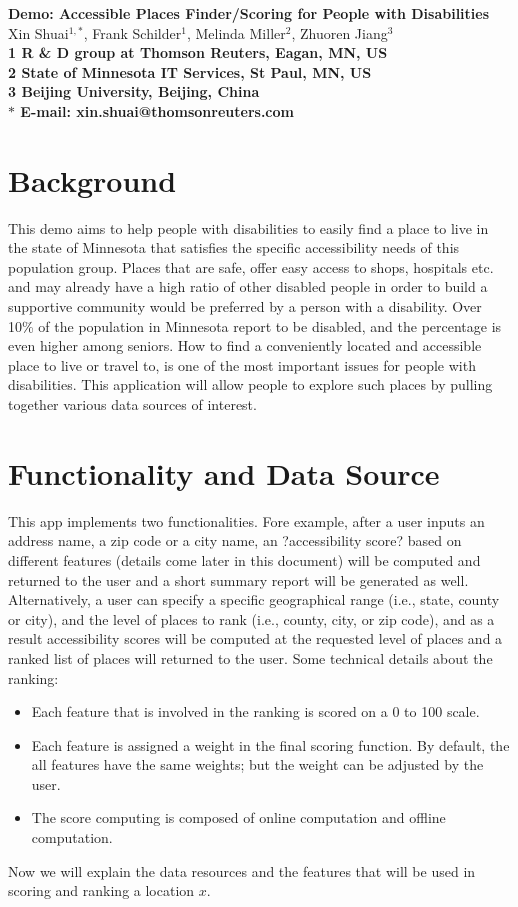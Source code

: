 \documentclass[10pt]{article}
\date{}
\begin{document}
\begin{flushleft}
{\Large
\textbf{Demo: Accessible Places Finder/Scoring for People with Disabilities}
}
\\
Xin Shuai$^{1,\ast}$,
Frank Schilder$^{1}$,
Melinda Miller$^{2}$,
Zhuoren Jiang$^{3}$
\\
\bf{1} R \& D group at Thomson Reuters, Eagan, MN, US
\\
\bf{2} State of Minnesota IT Services, St Paul, MN, US
\\
\bf{3} Beijing University, Beijing, China
\\
$\ast$ E-mail: xin.shuai@thomsonreuters.com
\end{flushleft}


\section{Background}
This demo aims to help people with disabilities to easily find a place to live in the state of Minnesota that satisfies the specific accessibility needs of this population group. Places that are safe, offer easy access to shops, hospitals etc. and may already have a high ratio of other disabled people in order to build a supportive community would be preferred by a person with a disability. Over 10\% of the population in Minnesota report to be disabled, and the percentage is even higher among seniors. How to find a conveniently located and accessible place to live or travel to, is one of the most important issues for people with disabilities. This application will allow people to explore such places by pulling together various data sources of interest.

\section{Functionality and Data Source}
This app implements two functionalities. Fore example, after a user inputs an address name, a zip code or a city name, an ?accessibility score? based on different features (details come later in this document) will be computed and returned to the user and a short summary report will be generated as well. Alternatively, a user can specify a specific geographical range (i.e., state, county or city), and the level of places to rank (i.e., county, city, or zip code), and as a result accessibility scores will be computed at the requested level of places and a ranked list of places will returned to the user. 
Some technical details about the ranking:
\begin{itemize}
\item Each feature that is involved in the ranking is scored on a 0 to 100 scale. 
\item Each feature is assigned a weight in the final scoring function. By default, the all features have the same weights; but the weight can be adjusted by the user.
\item The score computing is composed of online computation and offline computation. 
\end{itemize}
Now we will explain the data resources and the features that will be used in scoring and ranking a location $x$. 
\end{document}
